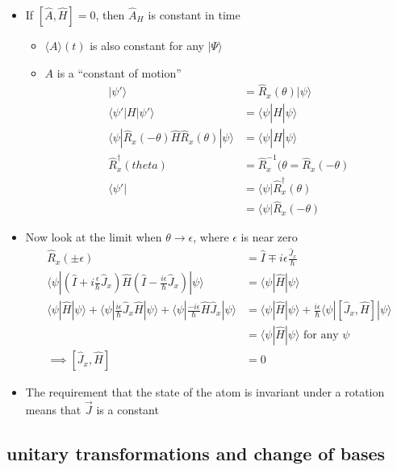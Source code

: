 \documentclass[a4paper,11pt,normalem]{article}
\begin{document}
\begin{itemize}
\item
  If \([\hat{A},\hat{H}] = 0\), then \(\hat{A}_{H_{}}\) is constant in
  time
  \begin{itemize}
  \item
    \(\langle A\rangle(t)\) is also constant for any \(|\Psi\rangle\)
  \item
    \(A\) is a ``constant of motion''
\[
    \begin{aligned}
    |\psi'\rangle &= \hat{R}_x(\theta)|\psi\rangle \\
    \langle\psi'|H|\psi'\rangle &= \langle\psi|\hat{H}|\psi\rangle \\
    \langle\psi|\hat{R}_x(-\theta)\hat{H}\hat{R}_x(\theta)|\psi\rangle &= \langle\psi|\hat{H}|\psi\rangle \\
    \hat{R}_x^\dagger(theta) &= \hat{R}_x^{-1}(\theta = \hat{R}_x(-\theta) \\
    \langle\psi'| &= \langle\psi|\hat{R}_x^\dagger (\theta) \\
    &= \langle\psi|\hat{R}_x(-\theta)
    \end{aligned}
\]
  \end{itemize}
\item
  Now look at the limit when \(\theta \to \epsilon\), where \(\epsilon\)
  is near zero
\[
    \begin{aligned}
    \hat{R}_x(\pm\epsilon) &= \hat{I} \mp i\epsilon\frac{\hat{J}_x}{\hbar} \\
    \langle\psi|\left(\hat{I} + i\frac{\epsilon}{\hbar}\hat{J}_x\right)\hat{H}\left(\hat{I} - \frac{i\epsilon}{\hbar}\hat{J}_x\right)|\psi\rangle &= \langle\psi|\hat{H}|\psi\rangle \\
    \langle\psi|\hat{H}|\psi\rangle + \langle\psi|\frac{i\epsilon}{\hbar}\hat{J}_x\hat{H}|\psi\rangle + \langle\psi|\frac{-i\epsilon}{\hbar}\hat{H}\hat{J}_x|\psi\rangle &= \langle\psi|\hat{H}|\psi\rangle + \frac{i\epsilon}{\hbar}\langle\psi|[\hat{J}_x,\hat{H}]|\psi\rangle \\
    &= \langle\psi|\hat{H}|\psi\rangle \text{ for any } \psi \\
    \implies [\hat{J}_x,\hat{H}] &= 0
    \end{aligned}
\]
\item
  The requirement that the state of the atom is invariant under a
  rotation means that \(\vec{J}\) is a constant
\end{itemize}

\subsection{unitary transformations and change of bases}\label{unitary-transformations-and-change-of-bases}
\end{document}
